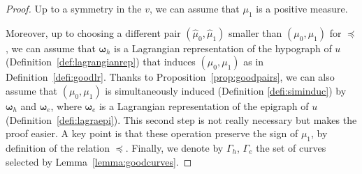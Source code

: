 \documentclass[10pt,a4paper]{amsart}
\newcommand{\bs}[1]{\boldsymbol{#1}}
\begin{document}
\begin{proof}
Up to a symmetry in the $v$, we can assume that $\mu_1$ is a positive measure.

  Moreover, up to choosing a different pair $(\hat \mu_0, \hat \mu_1)$ smaller than $(\mu_0, \mu_1)$ for $\preceq$, we can assume that $\bs \omega_h$ is a Lagrangian representation of the hypograph of $u$ (Definition~\ref{def:lagrangianrep}) that induces $(\mu_0, \mu_1)$ as in Definition~\ref{defi:goodlr}. Thanks to Proposition~\ref{prop:goodpairs}, we can also assume that $(\mu_0, \mu_1)$ is simultaneously induced (Definition \ref{defi:siminduc}) by $\bs \omega_h$ and $\bs \omega_e$, where $\bs \omega_e$ is a Lagrangian representation of the epigraph of $u$ (Definition~\ref{defi:lagraepi}). This second step is not really necessary but makes the proof easier. A key point is that these operation preserve the sign of $\mu_1$, by definition of the relation $\preceq$. Finally, we denote by $\Gamma_h$, $\Gamma_e$ the set of curves selected by Lemma~\ref{lemma:goodcurves}.
  

\end{proof}
\end{document}
